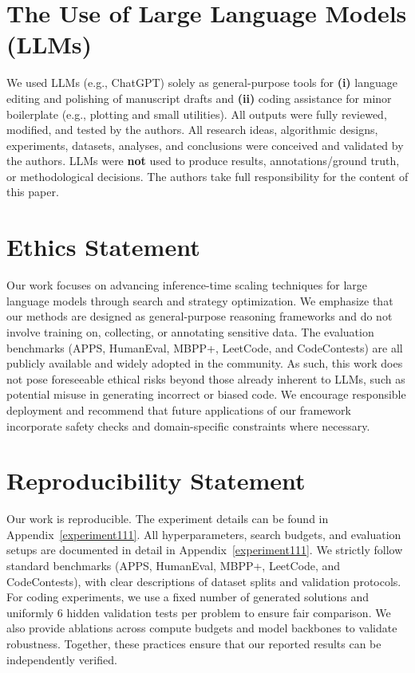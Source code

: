 \documentclass[11pt]{article}
\theoremstyle{definition}
\theoremstyle{remark}
\begin{document}
\section{The Use of Large Language Models (LLMs)}
We used LLMs (e.g., ChatGPT) solely as general-purpose tools for
\textbf{(i)} language editing and polishing of manuscript drafts and
\textbf{(ii)} coding assistance for minor boilerplate (e.g., plotting and small utilities).
All outputs were fully reviewed, modified, and tested by the authors.
All research ideas, algorithmic designs, experiments, datasets, analyses, and conclusions
were conceived and validated by the authors.
LLMs were \textbf{not} used to produce results, annotations/ground truth, or methodological decisions.
The authors take full responsibility for the content of this paper.


\section{Ethics Statement}
Our work focuses on advancing inference-time scaling techniques for large language models through search and strategy optimization. We emphasize that our methods are designed as general-purpose reasoning frameworks and do not involve training on, collecting, or annotating sensitive data. The evaluation benchmarks (APPS, HumanEval, MBPP+, LeetCode, and CodeContests) are all publicly available and widely adopted in the community. As such, this work does not pose foreseeable ethical risks beyond those already inherent to LLMs, such as potential misuse in generating incorrect or biased code. We encourage responsible deployment and recommend that future applications of our framework incorporate safety checks and domain-specific constraints where necessary.


\section{Reproducibility Statement}
Our work is reproducible. The experiment details can be found in Appendix~\ref{experiment111}. All hyperparameters, search budgets, and evaluation setups are documented in detail in Appendix~\ref{experiment111}. We strictly follow standard benchmarks (APPS, HumanEval, MBPP+, LeetCode, and CodeContests), with clear descriptions of dataset splits and validation protocols. For coding experiments, we use a fixed number of generated solutions and uniformly 6 hidden validation tests per problem to ensure fair comparison. We also provide ablations across compute budgets and model backbones to validate robustness. Together, these practices ensure that our reported results can be independently verified.
\end{document}
